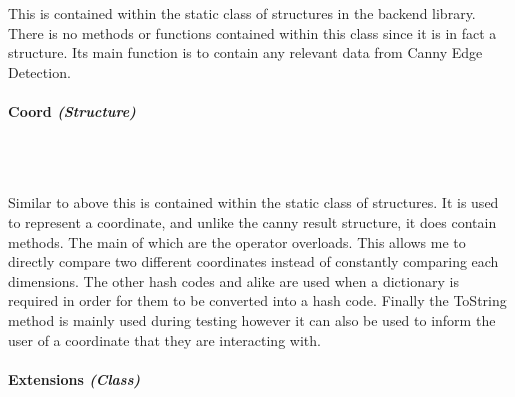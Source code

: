 \begin{FlushLeft}
    This is contained within the static class of structures in the backend library. There is no methods or functions contained within this class since it is in fact a structure. Its main function is to contain any relevant data from Canny Edge Detection.

    \bk
    \pagebreak
    \paragraph{Coord \textit{(Structure)}} \mbox{} \\

    \begin{figure}[H]
        \centering
    \end{figure}\\

    Similar to above this is contained within the static class of structures. It is used to represent a coordinate, and unlike the canny result structure, it does contain methods. The main of which are the operator overloads. This allows me to directly compare two different coordinates instead of constantly comparing each dimensions. The other hash codes and alike are used when a dictionary is required in order for them to be converted into a hash code. Finally the ToString method is mainly used during testing however it can also be used to inform the user of a coordinate that they are interacting with.

    \bk
    \pagebreak
    \paragraph{Extensions \textit{(Class)}} \mbox{} \\

    \begin{figure}[H]
        \centering
    \end{figure}\\


\end{FlushLeft}
